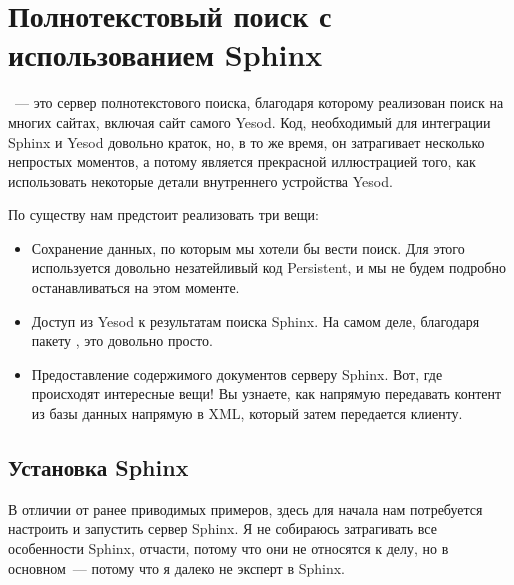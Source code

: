 \chapter{Полнотекстовый поиск с использованием Sphinx}\label{chap:sphinx} %

~--- это сервер полнотекстового поиска, благодаря которому реализован поиск на многих сайтах, включая сайт самого Yesod. Код, необходимый для интеграции Sphinx и Yesod довольно краток, но, в то же время, он затрагивает несколько непростых моментов, а потому является прекрасной иллюстрацией того, как использовать некоторые детали внутреннего устройства Yesod. %

По существу нам предстоит реализовать три вещи: %

\begin{itemize}
  \item Сохранение данных, по которым мы хотели бы вести поиск. Для этого используется довольно незатейливый код Persistent, и мы не будем подробно останавливаться на этом моменте. %
  \item Доступ из Yesod к результатам поиска Sphinx. На самом деле, благодаря пакету , это довольно просто.
  \item Предоставление содержимого документов серверу Sphinx. Вот, где происходят интересные вещи! Вы узнаете, как напрямую передавать контент из базы данных напрямую в XML, который затем передается клиенту. %
\end{itemize}

\section{Установка Sphinx} %

В отличии от ранее приводимых примеров, здесь для начала нам потребуется настроить и запустить сервер Sphinx. Я не собираюсь затрагивать все особенности Sphinx, отчасти, потому что они не относятся к делу, но в основном~--- потому что я далеко не эксперт в Sphinx.

